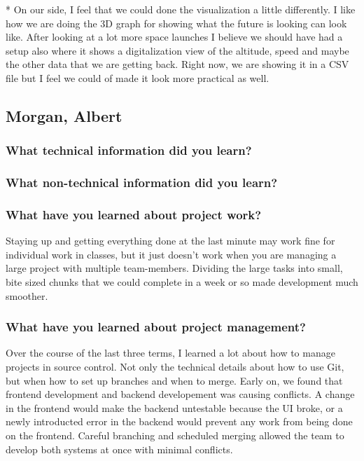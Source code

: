 \documentclass[10pt,draftclsnofoot,onecolumn]{IEEEtran}
\begin{document}
\subsubsection{}*  
On our side, I feel that we could done the visualization a little differently.  I like how we are doing the 3D graph for showing what the future is looking can look like.  After looking at a lot more space launches I believe we should have had a setup also where it shows a digitalization view of the altitude, speed and maybe the other data that we are getting back.  Right now, we are showing it in a CSV file but I feel we could of made it look more practical as well. 

\subsection{Morgan, Albert}



\subsubsection{What technical information did you learn?}
\subsubsection{What non-technical information did you learn?}
\subsubsection{What have you learned about project work?}
Staying up and getting everything done at the last minute may work fine for individual work in classes,
but it just doesn't work when you are managing a large project with multiple team-members.
Dividing the large tasks into small, bite sized chunks that we could complete in a week or so made development much smoother.
\subsubsection{What have you learned about project management?}
Over the course of the last three terms, I learned a lot about how to manage projects in source control.
Not only the technical details about how to use Git, but when how to set up branches and when to merge.
Early on, we found that frontend development and backend developement was causing conflicts.
A change in the frontend would make the backend untestable because the UI broke,
or a newly introducted error in the backend would prevent any work from being done on the frontend.
Careful branching and scheduled merging allowed the team to develop both systems at once
with minimal conflicts.
\end{document}
